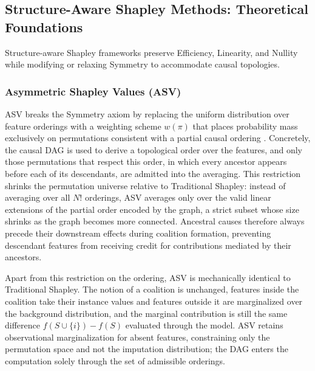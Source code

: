 \documentclass[12pt,a4paper,oneside]{article}
\begin{document}
\subsection{Structure-Aware Shapley Methods: Theoretical Foundations}

Structure-aware Shapley frameworks preserve Efficiency, Linearity, and Nullity while modifying or relaxing Symmetry to accommodate causal topologies.

\subsubsection{Asymmetric Shapley Values (ASV)}

ASV breaks the Symmetry axiom by replacing the uniform distribution over feature orderings with a weighting scheme $w(\pi)$ that places probability mass exclusively on permutations consistent with a partial causal ordering \citep{Frye2021}. Concretely, the causal DAG is used to derive a topological order over the features, and only those permutations that respect this order, in which every ancestor appears before each of its descendants, are admitted into the averaging. This restriction shrinks the permutation universe relative to Traditional Shapley: instead of averaging over all $N!$ orderings, ASV averages only over the valid linear extensions of the partial order encoded by the graph, a strict subset whose size shrinks as the graph becomes more connected. Ancestral causes therefore always precede their downstream effects during coalition formation, preventing descendant features from receiving credit for contributions mediated by their ancestors.

Apart from this restriction on the ordering, ASV is mechanically identical to Traditional Shapley. The notion of a coalition is unchanged, features inside the coalition take their instance values and features outside it are marginalized over the background distribution, and the marginal contribution is still the same difference $f(S \cup \{i\}) - f(S)$ evaluated through the model. ASV retains observational marginalization for absent features, constraining only the permutation space and not the imputation distribution; the DAG enters the computation solely through the set of admissible orderings.
\end{document}
